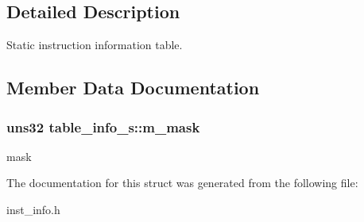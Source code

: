 \subsection{Detailed Description}
Static instruction information table. 

\subsection{Member Data Documentation}
\hypertarget{structtable__info__s_aa8b53b8afc01a0a76b41fc2ab6b37574}{
\subsubsection[{m\_\-mask}]{\setlength{\rightskip}{0pt plus 5cm}uns32 {\bf table\_\-info\_\-s::m\_\-mask}}}
\label{structtable__info__s_aa8b53b8afc01a0a76b41fc2ab6b37574}
mask 

The documentation for this struct was generated from the following file:\begin{DoxyCompactItemize}
\item 
inst\_\-info.h\end{DoxyCompactItemize}
